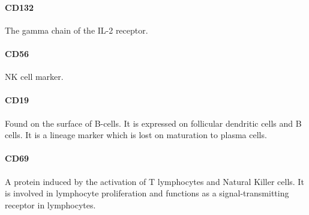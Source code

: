 \paragraph{CD132}
The gamma chain of the IL-2 receptor.

\paragraph{CD56}
NK cell marker.


\paragraph{CD19}
Found on the surface of B-cells.
It is expressed on follicular dendritic cells and B cells.
It is a lineage marker which is lost on maturation to plasma cells.



\paragraph{CD69}
A protein induced by the activation of T lymphocytes and Natural Killer cells.
It is involved in lymphocyte proliferation and functions as a signal-transmitting receptor in lymphocytes.


